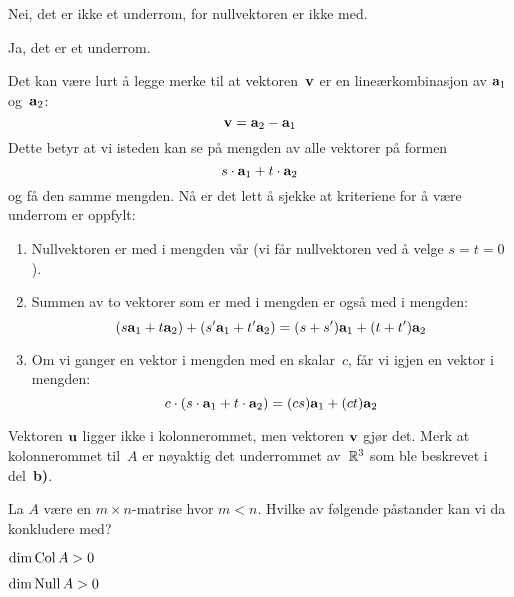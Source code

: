 \begin{losning}

\begin{punkt}
Nei, det er ikke et underrom, for nullvektoren er ikke med.
\end{punkt}

\begin{punkt}
Ja, det er et underrom.

Det kan være lurt å legge merke til at vektoren~$\mathbf{v}$
er en lineærkombinasjon av $\mathbf{a}_1$ og~$\mathbf{a}_2$:
\[
\mathbf{v} = \mathbf{a}_2 - \mathbf{a}_1
\]
Dette betyr at vi isteden kan se på mengden av alle vektorer på formen
\[
s \cdot \mathbf{a}_1 + t \cdot \mathbf{a}_2
\]
og få den samme mengden.
Nå er det lett å sjekke at kriteriene for å være underrom er oppfylt:
\begin{enumerate}
\item Nullvektoren er med i mengden vår
(vi får nullvektoren ved å velge $s = t = 0$).
\item Summen av to vektorer som er med i mengden er også med i mengden:
\[
(s \mathbf{a}_1 + t \mathbf{a}_2)
+ (s' \mathbf{a}_1 + t' \mathbf{a}_2)
= (s + s') \mathbf{a}_1 + (t + t') \mathbf{a}_2
\]
\item Om vi ganger en vektor i mengden med en skalar~$c$,
får vi igjen en vektor i mengden:
\[
c \cdot (s \cdot \mathbf{a}_1 + t \cdot \mathbf{a}_2)
= (cs) \mathbf{a}_1 + (ct) \mathbf{a}_2
\]
\end{enumerate}
\end{punkt}

\begin{punkt}
Vektoren $\mathbf{u}$ ligger ikke i kolonnerommet,
men vektoren $\mathbf{v}$ gjør det.
Merk at kolonnerommet til~$A$ er nøyaktig det underrommet av~$\mathbb{R}^3$
som ble beskrevet i del~\textbf{b)}.
%
\end{punkt}

\end{losning}

\begin{oppgave}
La $A$ være en $m\times n$-matrise hvor $m<n$.
Hvilke av følgende påstander kan vi da konkludere med?
\begin{punkt}
$\dim \operatorname{Col} A > 0$
\end{punkt}

\begin{punkt}
$\dim \operatorname{Null} A > 0$
\end{punkt}

\end{oppgave}

